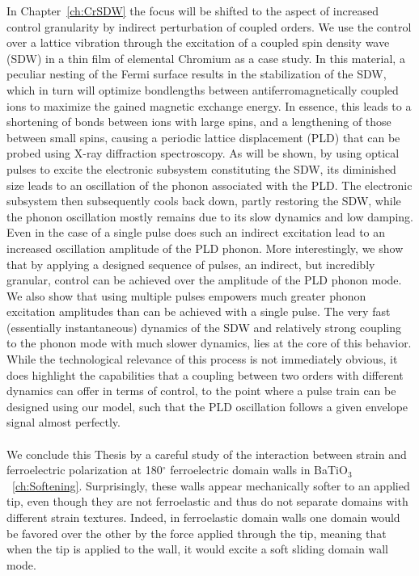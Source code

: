 In Chapter~\ref{ch:CrSDW} the focus will be shifted to the aspect of increased control granularity by indirect perturbation of coupled orders.
We use the control over a lattice vibration through the excitation of a coupled spin density wave (SDW) in a thin film of elemental Chromium as a case study.
In this material, a peculiar nesting of the Fermi surface results in the stabilization of the SDW, which in turn will optimize bondlengths between antiferromagnetically coupled ions to maximize the gained magnetic exchange energy.
In essence, this leads to a shortening of bonds between ions with large spins, and a lengthening of those between small spins, causing a periodic lattice displacement (PLD) that can be probed using X-ray diffraction spectroscopy.
As will be shown, by using optical pulses to excite the electronic subsystem constituting the SDW, its diminished size leads to an oscillation of the phonon associated with the PLD.
The electronic subsystem then subsequently cools back down, partly restoring the SDW, while the phonon oscillation mostly remains due to its slow dynamics and low damping.
Even in the case of a single pulse does such an indirect excitation lead to an increased oscillation amplitude of the PLD phonon.
More interestingly, we show that by applying a designed sequence of pulses, an indirect, but incredibly granular, control can be achieved over the amplitude of the PLD phonon mode.
We also show that using multiple pulses empowers much greater phonon excitation amplitudes than can be achieved with a single pulse.
The very fast (essentially instantaneous) dynamics of the SDW and relatively strong coupling to the phonon mode with much slower dynamics, lies at the core of this behavior.
While the technological relevance of this process is not immediately obvious, it does highlight the capabilities that a coupling between two orders with different dynamics can offer in terms of control, to the point where a pulse train can be designed using our model, such that the PLD oscillation follows a given envelope signal almost perfectly.
\\\\
We conclude this Thesis by a careful study of the interaction between strain and ferroelectric polarization at 180$^\circ$ ferroelectric domain walls in BaTiO$_3$~\ref{ch:Softening}.
Surprisingly, these walls appear mechanically softer to an applied tip, even though they are not ferroelastic and thus do not separate domains with different strain textures.
Indeed, in ferroelastic domain walls one domain would be favored over the other by the force applied through the tip, meaning that when the tip is applied to the wall, it would excite a soft sliding domain wall mode.
